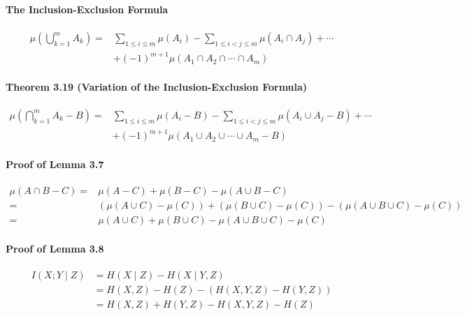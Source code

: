 \documentclass[8pt]{article}
\begin{document}
\begin{tcolorbox}
\paragraph{The Inclusion-Exclusion Formula}
$$
\begin{aligned}
\mu\left(\bigcup_{k=1}^{m} A_{k}\right)=& \sum_{1 \leq i \leq m} \mu\left(A_{i}\right)-\sum_{1 \leq i<j \leq m} \mu\left(A_{i} \cap A_{j}\right)+\cdots \\
&+(-1)^{m+1} \mu\left(A_{1} \cap A_{2} \cap \cdots \cap A_{m}\right)
\end{aligned}
$$

\paragraph{Theorem 3.19 (Variation of the Inclusion-Exclusion Formula)}
$$
\begin{aligned}
\mu\left(\bigcap_{k=1}^{m} A_{k}-B\right)=& \sum_{1 \leq i \leq m} \mu\left(A_{i}-B\right)-\sum_{1 \leq i<j \leq m} \mu\left(A_{i} \cup A_{j}-B\right)+\cdots \\
&+(-1)^{m+1} \mu\left(A_{1} \cup A_{2} \cup \cdots \cup A_{m}-B\right)
\end{aligned}
$$
\end{tcolorbox}
\begin{tcolorbox}
\paragraph{Proof of Lemma 3.7}
$$
\begin{aligned}
\mu(A \cap B-C)=& \mu(A-C)+\mu(B-C)-\mu(A \cup B-C) \\
=&(\mu(A \cup C)-\mu(C))+(\mu(B \cup C)-\mu(C)) -(\mu(A \cup B \cup C)-\mu(C)) \\
=& \mu(A \cup C)+\mu(B \cup C)-\mu(A \cup B \cup C)-\mu(C)
\end{aligned}
$$
\paragraph{Proof of Lemma 3.8}
$$
\begin{aligned}
I(X ; Y \mid Z) &=H(X \mid Z)-H(X \mid Y, Z) \\
&=H(X, Z)-H(Z)-(H(X, Y, Z)-H(Y, Z)) \\
&=H(X, Z)+H(Y, Z)-H(X, Y, Z)-H(Z)
\end{aligned}
$$
\end{tcolorbox}
\end{document}
